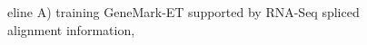 \documentclass[a4paper,10pt]{report}
\begin{document}
\begin{figure}
\begin{center}
eline A) training GeneMark-ET supported by RNA-Seq spliced alignment information,
\end{center}
\end{figure}
\end{document}
